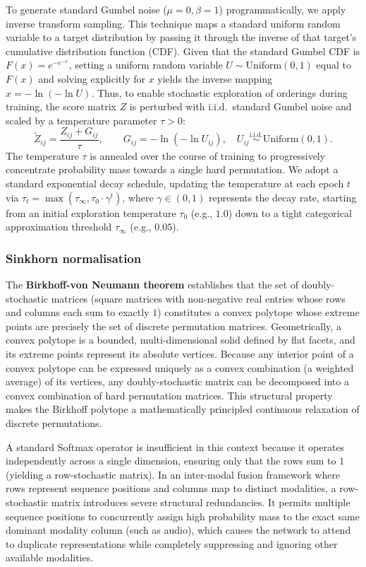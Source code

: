 \documentclass[11pt,a4paper]{article}
\begin{document}
	To generate standard Gumbel noise ($\mu=0, \beta=1$) programmatically, we apply inverse transform sampling. This technique maps a standard uniform random variable to a target distribution by passing it through the inverse of that target's cumulative distribution function (CDF). Given that the standard Gumbel CDF is $F(x) = e^{-e^{-x}}$, setting a uniform random variable $U \sim \mathrm{Uniform}(0,1)$ equal to $F(x)$ and solving explicitly for $x$ yields the inverse mapping $x = -\ln(-\ln U)$. Thus, to enable stochastic exploration of orderings during training, the score matrix $Z$ is perturbed with i.i.d.\ standard Gumbel noise and scaled by a temperature parameter $\tau > 0$:
	$$\tilde{Z}_{ij} = \frac{Z_{ij} + G_{ij}}{\tau}, \qquad G_{ij} = -\ln(-\ln U_{ij}), \quad U_{ij} \overset{\text{i.i.d.}}{\sim} \mathrm{Uniform}(0,1).$$
	The temperature $\tau$ is annealed over the course of training to progressively concentrate probability mass towards a single hard permutation. We adopt a standard exponential decay schedule, updating the temperature at each epoch $t$ via $\tau_t = \max(\tau_\infty, \tau_0 \cdot \gamma^t)$, where $\gamma \in (0, 1)$ represents the decay rate, starting from an initial exploration temperature $\tau_0$ (e.g., $1.0$) down to a tight categorical approximation threshold $\tau_\infty$ (e.g., $0.05$).
	
	\subsubsection*{Sinkhorn normalisation}
	The \textbf{Birkhoff-von Neumann theorem} \cite{birkhoff1946} establishes that the set of doubly-stochastic matrices (square matrices with non-negative real entries whose rows and columns each sum to exactly $1$) constitutes a convex polytope whose extreme points are precisely the set of discrete permutation matrices. Geometrically, a convex polytope is a bounded, multi-dimensional solid defined by flat facets, and its extreme points represent its absolute vertices. Because any interior point of a convex polytope can be expressed uniquely as a convex combination (a weighted average) of its vertices, any doubly-stochastic matrix can be decomposed into a convex combination of hard permutation matrices. This structural property makes the Birkhoff polytope a mathematically principled continuous relaxation of discrete permutations.
	
	A standard Softmax operator is insufficient in this context because it operates independently across a single dimension, ensuring only that the rows sum to $1$ (yielding a row-stochastic matrix). In an inter-modal fusion framework where rows represent sequence positions and columns map to distinct modalities, a row-stochastic matrix introduces severe structural redundancies. It permits multiple sequence positions to concurrently assign high probability mass to the exact same dominant modality column (such as audio), which causes the network to attend to duplicate representations while completely suppressing and ignoring other available modalities. 
	
\end{document}
